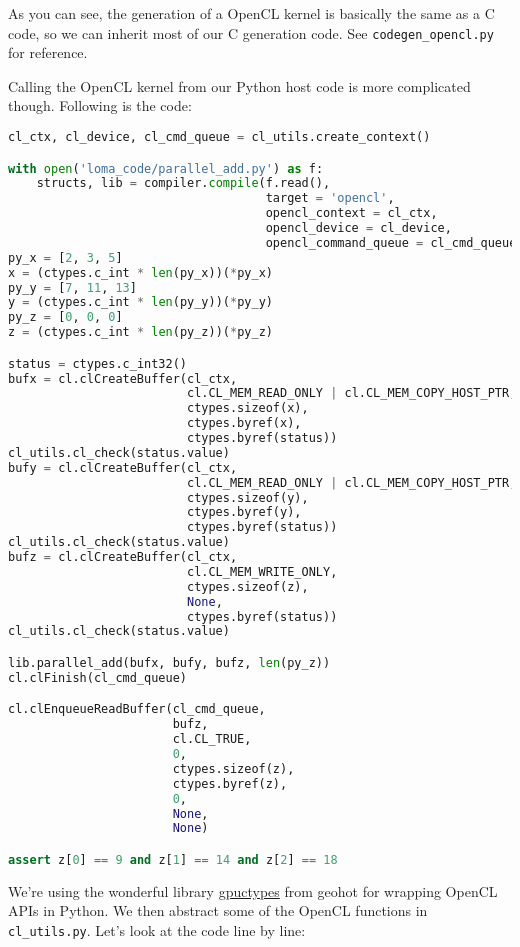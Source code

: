 As you can see, the generation of a OpenCL kernel is basically the same as a C code, so we can inherit most of our C generation code. See \lstinline{codegen_opencl.py} for reference.

Calling the OpenCL kernel from our Python host code is more complicated though. Following is the code:
\begin{lstlisting}[language=python]
cl_ctx, cl_device, cl_cmd_queue = cl_utils.create_context()

with open('loma_code/parallel_add.py') as f:
    structs, lib = compiler.compile(f.read(),
                                    target = 'opencl',
                                    opencl_context = cl_ctx,
                                    opencl_device = cl_device,
                                    opencl_command_queue = cl_cmd_queue)
py_x = [2, 3, 5]
x = (ctypes.c_int * len(py_x))(*py_x)
py_y = [7, 11, 13]
y = (ctypes.c_int * len(py_y))(*py_y)
py_z = [0, 0, 0]
z = (ctypes.c_int * len(py_z))(*py_z)

status = ctypes.c_int32()
bufx = cl.clCreateBuffer(cl_ctx,
                         cl.CL_MEM_READ_ONLY | cl.CL_MEM_COPY_HOST_PTR,
                         ctypes.sizeof(x),
                         ctypes.byref(x),
                         ctypes.byref(status))
cl_utils.cl_check(status.value)
bufy = cl.clCreateBuffer(cl_ctx,
                         cl.CL_MEM_READ_ONLY | cl.CL_MEM_COPY_HOST_PTR,
                         ctypes.sizeof(y),
                         ctypes.byref(y),
                         ctypes.byref(status))
cl_utils.cl_check(status.value)
bufz = cl.clCreateBuffer(cl_ctx,
                         cl.CL_MEM_WRITE_ONLY,
                         ctypes.sizeof(z),
                         None,
                         ctypes.byref(status))
cl_utils.cl_check(status.value)

lib.parallel_add(bufx, bufy, bufz, len(py_z))
cl.clFinish(cl_cmd_queue)

cl.clEnqueueReadBuffer(cl_cmd_queue,
                       bufz,
                       cl.CL_TRUE,
                       0,
                       ctypes.sizeof(z),
                       ctypes.byref(z),
                       0,
                       None,
                       None)

assert z[0] == 9 and z[1] == 14 and z[2] == 18
\end{lstlisting}
We're using the wonderful library \href{https://github.com/tinygrad/gpuctypes}{gpuctypes} from geohot for wrapping OpenCL APIs in Python. We then abstract some of the OpenCL functions in \lstinline{cl_utils.py}. Let's look at the code line by line:

